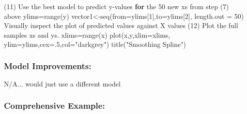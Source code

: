 \documentclass[
]{article}
\newenvironment{Shaded}{\begin{snugshade}}{\end{snugshade}}
\newcommand{\AttributeTok}[1]{\textcolor[rgb]{0.77,0.63,0.00}{#1}}
\newcommand{\ControlFlowTok}[1]{\textcolor[rgb]{0.13,0.29,0.53}{\textbf{#1}}}
\newcommand{\DecValTok}[1]{\textcolor[rgb]{0.00,0.00,0.81}{#1}}
\newcommand{\FunctionTok}[1]{\textcolor[rgb]{0.00,0.00,0.00}{#1}}
\newcommand{\NormalTok}[1]{#1}
\newcommand{\OtherTok}[1]{\textcolor[rgb]{0.56,0.35,0.01}{#1}}
\newcommand{\SpecialCharTok}[1]{\textcolor[rgb]{0.00,0.00,0.00}{#1}}
\newcommand{\StringTok}[1]{\textcolor[rgb]{0.31,0.60,0.02}{#1}}
\begin{document}
\begin{Shaded}
\begin{Highlighting}[]
\NormalTok{(}\DecValTok{11}\NormalTok{) Use the best model to predict y}\SpecialCharTok{{-}}\NormalTok{values }\ControlFlowTok{for}\NormalTok{ the }\DecValTok{50}\NormalTok{ new x}\StringTok{\textquotesingle{}s from step (7) above}
\StringTok{ylims=range(y)}
\StringTok{vector1\textless{}{-}seq(from=ylims[1],to=ylims[2], length.out = 50)}
\StringTok{Visually inspect the plot of predicted values against X values}
\StringTok{(12)    Plot the full sample\textquotesingle{}}\NormalTok{s x}\StringTok{\textquotesingle{}s and y\textquotesingle{}}\NormalTok{s.}
\NormalTok{xlims}\OtherTok{=}\FunctionTok{range}\NormalTok{(x)}
\FunctionTok{plot}\NormalTok{(x,y,}\AttributeTok{xlim=}\NormalTok{xlims, }\AttributeTok{ylim=}\NormalTok{ylims,}\AttributeTok{cex=}\NormalTok{.}\DecValTok{5}\NormalTok{,}\AttributeTok{col=}\StringTok{"darkgrey"}\NormalTok{)}
\FunctionTok{title}\NormalTok{(}\StringTok{"Smoothing Spline"}\NormalTok{)}
\end{Highlighting}
\end{Shaded}

\hypertarget{model-improvements-7}{%
\subsubsection{Model Improvements:}\label{model-improvements-7}}

\begin{Shaded}
\begin{Highlighting}[]
\NormalTok{N}\SpecialCharTok{/}\NormalTok{A... would just use a different model}
\end{Highlighting}
\end{Shaded}

\hypertarget{comprehensive-example-7}{%
\subsubsection{Comprehensive Example:}\label{comprehensive-example-7}}
\end{document}
